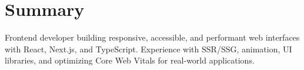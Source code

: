 \section{Summary}
Frontend developer building responsive, accessible, and performant web interfaces with React, Next.js, and TypeScript. Experience with SSR/SSG, animation, UI libraries, and optimizing Core Web Vitals for real-world applications.
